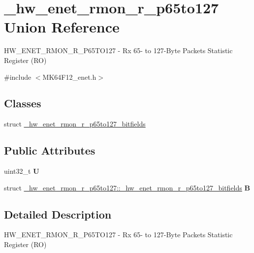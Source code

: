 \hypertarget{union__hw__enet__rmon__r__p65to127}{}\section{\+\_\+hw\+\_\+enet\+\_\+rmon\+\_\+r\+\_\+p65to127 Union Reference}
\label{union__hw__enet__rmon__r__p65to127}


H\+W\+\_\+\+E\+N\+E\+T\+\_\+\+R\+M\+O\+N\+\_\+\+R\+\_\+\+P65\+T\+O127 -\/ Rx 65-\/ to 127-\/\+Byte Packets Statistic Register (RO)  




{\ttfamily \#include $<$M\+K64\+F12\+\_\+enet.\+h$>$}

\subsection*{Classes}
\begin{DoxyCompactItemize}
\item 
struct \hyperlink{struct__hw__enet__rmon__r__p65to127_1_1__hw__enet__rmon__r__p65to127__bitfields}{\+\_\+hw\+\_\+enet\+\_\+rmon\+\_\+r\+\_\+p65to127\+\_\+bitfields}
\end{DoxyCompactItemize}
\subsection*{Public Attributes}
\begin{DoxyCompactItemize}
\item 
uint32\+\_\+t {\bfseries U}\hypertarget{union__hw__enet__rmon__r__p65to127_a36c87c02cfe59a67a547fbdd0719708c}{}\label{union__hw__enet__rmon__r__p65to127_a36c87c02cfe59a67a547fbdd0719708c}

\item 
struct \hyperlink{struct__hw__enet__rmon__r__p65to127_1_1__hw__enet__rmon__r__p65to127__bitfields}{\+\_\+hw\+\_\+enet\+\_\+rmon\+\_\+r\+\_\+p65to127\+::\+\_\+hw\+\_\+enet\+\_\+rmon\+\_\+r\+\_\+p65to127\+\_\+bitfields} {\bfseries B}\hypertarget{union__hw__enet__rmon__r__p65to127_acea06e57c27a1dc9d9fbe34e47d79f73}{}\label{union__hw__enet__rmon__r__p65to127_acea06e57c27a1dc9d9fbe34e47d79f73}

\end{DoxyCompactItemize}


\subsection{Detailed Description}
H\+W\+\_\+\+E\+N\+E\+T\+\_\+\+R\+M\+O\+N\+\_\+\+R\+\_\+\+P65\+T\+O127 -\/ Rx 65-\/ to 127-\/\+Byte Packets Statistic Register (RO) 

